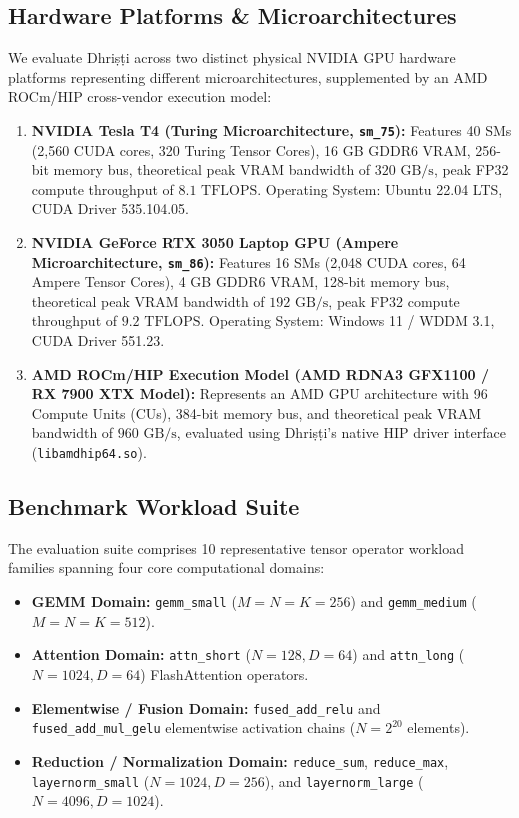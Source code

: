 \documentclass[10pt,journal,compsoc]{IEEEtran}
\begin{document}
\subsection{Hardware Platforms \& Microarchitectures}
We evaluate Dhri\d{s}\d{t}i across two distinct physical NVIDIA GPU hardware platforms representing different microarchitectures, supplemented by an AMD ROCm/HIP cross-vendor execution model:
\begin{enumerate}
    \item \textbf{NVIDIA Tesla T4 (Turing Microarchitecture, \texttt{sm\_75}):} Features 40 SMs (2,560 CUDA cores, 320 Turing Tensor Cores), 16 GB GDDR6 VRAM, 256-bit memory bus, theoretical peak VRAM bandwidth of $320\text{ GB/s}$, peak FP32 compute throughput of $8.1\text{ TFLOPS}$. Operating System: Ubuntu 22.04 LTS, CUDA Driver 535.104.05.
    \item \textbf{NVIDIA GeForce RTX 3050 Laptop GPU (Ampere Microarchitecture, \texttt{sm\_86}):} Features 16 SMs (2,048 CUDA cores, 64 Ampere Tensor Cores), 4 GB GDDR6 VRAM, 128-bit memory bus, theoretical peak VRAM bandwidth of $192\text{ GB/s}$, peak FP32 compute throughput of $9.2\text{ TFLOPS}$. Operating System: Windows 11 / WDDM 3.1, CUDA Driver 551.23.
    \item \textbf{AMD ROCm/HIP Execution Model (AMD RDNA3 GFX1100 / RX 7900 XTX Model):} Represents an AMD GPU architecture with 96 Compute Units (CUs), 384-bit memory bus, and theoretical peak VRAM bandwidth of $960\text{ GB/s}$, evaluated using Dhri\d{s}\d{t}i's native HIP driver interface (\texttt{libamdhip64.so}).
\end{enumerate}

\subsection{Benchmark Workload Suite}
The evaluation suite comprises 10 representative tensor operator workload families spanning four core computational domains:
\begin{itemize}
    \item \textbf{GEMM Domain:} \texttt{gemm\_small} ($M=N=K=256$) and \texttt{gemm\_medium} ($M=N=K=512$).
    \item \textbf{Attention Domain:} \texttt{attn\_short} ($N=128, D=64$) and \texttt{attn\_long} ($N=1024, D=64$) FlashAttention operators.
    \item \textbf{Elementwise / Fusion Domain:} \texttt{fused\_add\_relu} and \texttt{fused\_add\_mul\_gelu} elementwise activation chains ($N = 2^{20}$ elements).
    \item \textbf{Reduction / Normalization Domain:} \texttt{reduce\_sum}, \texttt{reduce\_max}, \texttt{layernorm\_small} ($N=1024, D=256$), and \texttt{layernorm\_large} ($N=4096, D=1024$).
\end{itemize}
\end{document}
